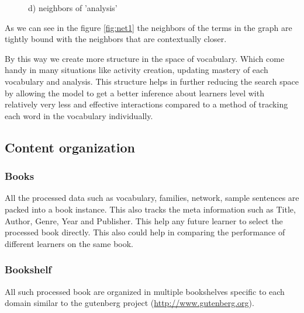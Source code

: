 \documentclass[11pt,a4paper]{article}
\begin{document}
\begin{figure}[h!]
\begin{center}
\caption{d) neighbors of 'analysis' }

\end{center}
\end{figure}

As we can see in the figure \ref{fig:net1} the neighbors of the terms in the
graph are tightly bound with the neighbors that are contextually closer.

By this way we create more structure in the space of vocabulary. Which come
handy in many situations like activity creation, updating mastery of each
vocabulary and analysis. This structure helps in further reducing the search space
by allowing the model to get a better inference about learners level with
relatively very less and effective interactions compared to a method of
tracking each word in the vocabulary individually.


\subsection{Content organization}
\subsubsection{Books}
All the processed data such as vocabulary, families, network, sample sentences
are packed into a book instance. This also tracks the meta information such as
Title, Author, Genre, Year and Publisher. This help any future learner to select
the processed book directly. This also could help in comparing the performance
of different learners on the same book.

\subsubsection{Bookshelf}
All such processed book are organized in multiple bookshelves specific to each
domain similar to the gutenberg project (\url{http://www.gutenberg.org}).
\end{document}
